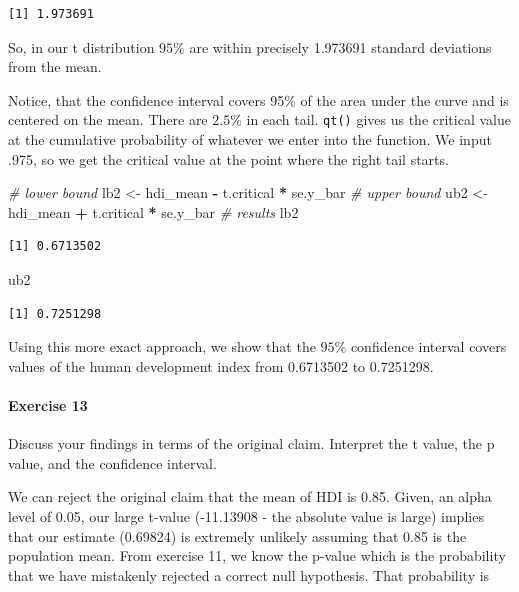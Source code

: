 \documentclass[]{article}
\newenvironment{Shaded}{\begin{snugshade}}{\end{snugshade}}
\newcommand{\StringTok}[1]{\textcolor[rgb]{0.31,0.60,0.02}{#1}}
\newcommand{\CommentTok}[1]{\textcolor[rgb]{0.56,0.35,0.01}{\textit{#1}}}
\newcommand{\OperatorTok}[1]{\textcolor[rgb]{0.81,0.36,0.00}{\textbf{#1}}}
\newcommand{\NormalTok}[1]{#1}
\let\oldparagraph\paragraph
\renewcommand{\paragraph}[1]{\oldparagraph{#1}\mbox{}}
\theoremstyle{definition}
\theoremstyle{definition}
\theoremstyle{definition}
\theoremstyle{remark}
\begin{document}
\begin{verbatim}
[1] 1.973691
\end{verbatim}

So, in our t distribution \(95\%\) are within precisely 1.973691
standard deviations from the mean.

Notice, that the confidence interval covers 95\% of the area under the
curve and is centered on the mean. There are \(2.5\%\) in each tail.
\texttt{qt()} gives us the critical value at the cumulative probability
of whatever we enter into the function. We input .975, so we get the
critical value at the point where the right tail starts.

\begin{Shaded}
\begin{Highlighting}[]
\CommentTok{# lower bound}
\NormalTok{lb2 <-}\StringTok{ }\NormalTok{hdi_mean }\OperatorTok{-}\StringTok{ }\NormalTok{t.critical }\OperatorTok{*}\StringTok{ }\NormalTok{se.y_bar}
\CommentTok{# upper bound}
\NormalTok{ub2 <-}\StringTok{ }\NormalTok{hdi_mean }\OperatorTok{+}\StringTok{ }\NormalTok{t.critical }\OperatorTok{*}\StringTok{ }\NormalTok{se.y_bar}
\CommentTok{# results}
\NormalTok{lb2}
\end{Highlighting}
\end{Shaded}

\begin{verbatim}
[1] 0.6713502
\end{verbatim}

\begin{Shaded}
\begin{Highlighting}[]
\NormalTok{ub2}
\end{Highlighting}
\end{Shaded}

\begin{verbatim}
[1] 0.7251298
\end{verbatim}

Using this more exact approach, we show that the \(95\%\) confidence
interval covers values of the human development index from 0.6713502 to
0.7251298.

\paragraph{Exercise 13}\label{exercise-13-1}

Discuss your findings in terms of the original claim. Interpret the t
value, the p value, and the confidence interval.

We can reject the original claim that the mean of HDI is 0.85. Given, an
alpha level of 0.05, our large t-value (-11.13908 - the absolute value
is large) implies that our estimate (0.69824) is extremely unlikely
assuming that 0.85 is the population mean. From exercise 11, we know the
p-value which is the probability that we have mistakenly rejected a
correct null hypothesis. That probability is
\end{document}
